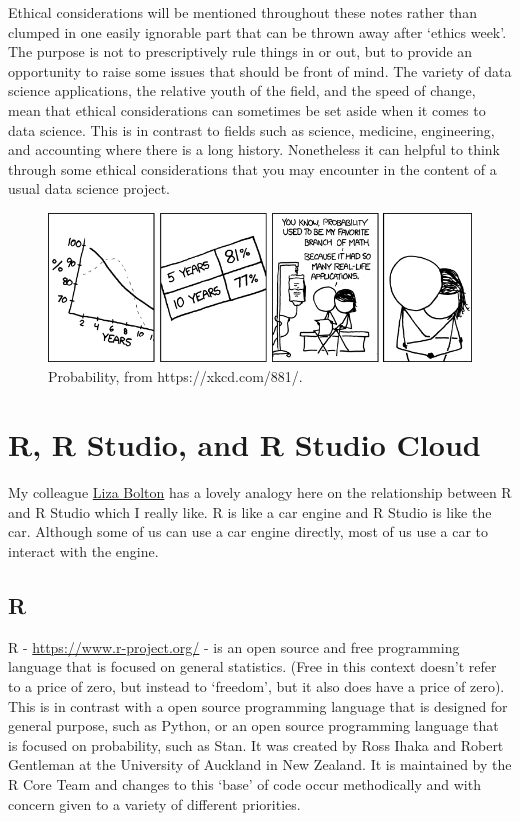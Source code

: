 \documentclass[
]{book}
\begin{document}
Ethical considerations will be mentioned throughout these notes rather than clumped in one easily ignorable part that can be thrown away after `ethics week'. The purpose is not to prescriptively rule things in or out, but to provide an opportunity to raise some issues that should be front of mind. The variety of data science applications, the relative youth of the field, and the speed of change, mean that ethical considerations can sometimes be set aside when it comes to data science. This is in contrast to fields such as science, medicine, engineering, and accounting where there is a long history. Nonetheless it can helpful to think through some ethical considerations that you may encounter in the content of a usual data science project.

\begin{figure}
\includegraphics[width=0.9\linewidth]{figures/probability} \caption{Probability, from https://xkcd.com/881/.}\label{fig:unnamed-chunk-17}
\end{figure}

\hypertarget{r-r-studio-and-r-studio-cloud}{%
\section{R, R Studio, and R Studio Cloud}\label{r-r-studio-and-r-studio-cloud}}

My colleague \href{https://twitter.com/liza_bolton}{Liza Bolton} has a lovely analogy here on the relationship between R and R Studio which I really like. R is like a car engine and R Studio is like the car. Although some of us can use a car engine directly, most of us use a car to interact with the engine.

\hypertarget{r}{%
\subsection{R}\label{r}}

R - \url{https://www.r-project.org/} - is an open source and free programming language that is focused on general statistics. (Free in this context doesn't refer to a price of zero, but instead to `freedom', but it also does have a price of zero). This is in contrast with a open source programming language that is designed for general purpose, such as Python, or an open source programming language that is focused on probability, such as Stan. It was created by Ross Ihaka and Robert Gentleman at the University of Auckland in New Zealand. It is maintained by the R Core Team and changes to this `base' of code occur methodically and with concern given to a variety of different priorities.
\end{document}
